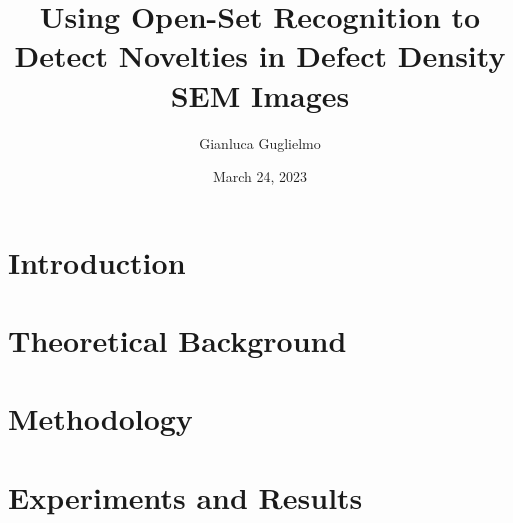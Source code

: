 \documentclass{beamer}
\title{Using Open-Set Recognition to Detect Novelties in Defect Density SEM Images}
\author{Gianluca Guglielmo}
\date{March 24, 2023}
\begin{document}
\maketitle

\section{Introduction}


\section{Theoretical Background}


\section{Methodology}


\section{Experiments and Results}

\end{document}
